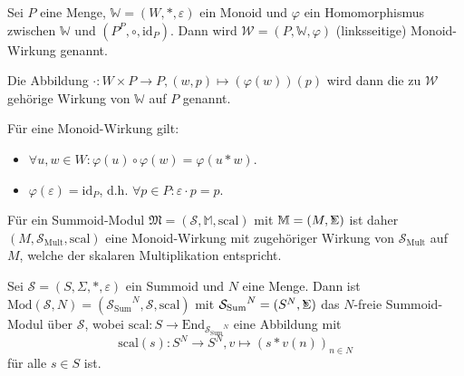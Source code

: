 \documentclass{article}
\DeclareMathOperator*{\Sigmacirc}{%
  \ThisStyle{\mathop{\ensurestackMath{\stackinset{c}{-0.75\LMpt}{c}{}{%
  \rotatebox[origin=lb]{-90}{$\circ$}}{\SavedStyle\Sigma}}}}}
\begin{document}
\begin{definition}
  Sei $P$ eine Menge, $\mathbb{W} = (W, \ast, \varepsilon)$ ein Monoid
  und $\varphi$ ein Homomorphismus zwischen $\mathbb{W}$ und $(P^P, \circ, \text{id}_P)$.
  Dann wird $\mathcal{W} = (P, \mathbb{W}, \varphi)$ (linksseitige) Monoid-Wirkung
  genannt.

  Die Abbildung $\cdot \colon W \times P \to P, (w, p) \mapsto (\varphi(w))(p)$
  wird dann die zu $\mathcal{W}$ gehörige Wirkung von $\mathbb{W}$ auf $P$ genannt.
\end{definition}

\begin{remark}
  Für eine Monoid-Wirkung gilt:
  \begin{itemize}
    \item $\forall u, w \in W \colon \varphi(u) \circ \varphi(w) = \varphi(u \ast w)$.
    \item $\varphi(\varepsilon) = \text{id}_P$, d.h. $\forall p \in P \colon \varepsilon \cdot p = p$.
  \end{itemize}
\end{remark}

\begin{remark}
  Für ein Summoid-Modul $\mathfrak{M} = (\mathcal{S}, \mathbb{M}, \text{scal})$ mit $\mathbb{M} = (M, \Sigmacirc)$
  ist daher $(M, \mathcal{S}_\text{Mult}, \text{scal})$ eine Monoid-Wirkung
  mit zugehöriger Wirkung von $\mathcal{S}_\text{Mult}$ auf $M$,
  welche der skalaren Multiplikation entspricht.
\end{remark}

\begin{definition}
  Sei $\mathcal{S} = (S, \Sigma, \ast, \varepsilon)$ ein Summoid und $N$ eine Menge.
  Dann ist $\text{Mod}(\mathcal{S}, N) = ({\mathcal{S}_\text{Sum}}^N, \mathcal{S}, \text{scal})$
  mit ${\mathcal{S}_\text{Sum}}^N = (S^N, \Sigmacirc)$
  das $N$-freie Summoid-Modul über $\mathcal{S}$, wobei
  $\text{scal} \colon S \to \text{End}_{{\mathcal{S}_\text{Sum}}^N}$ eine Abbildung mit
  \begin{equation*}
    \text{scal}(s) \colon S^N \to S^N, v \mapsto (s \ast v(n))_{n \in N}
  \end{equation*}
  für alle $s \in S$ ist.
\end{definition}
\end{document}
